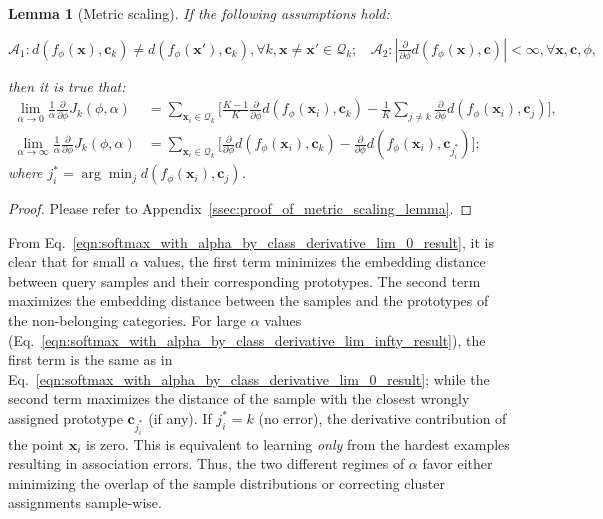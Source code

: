 \documentclass{article}
\renewcommand{\vec}[1]{\mathbf{#1}}
\newcommand{\query}[1]{\mathcal{Q}_{#1}}
\newcommand{\metric}{d}
\newtheorem{lemma}{Lemma}
\begin{document}
\begin{lemma}[Metric scaling] \label{lem:metric_scaling}
If the following assumptions hold: 

$\mathcal{A}_1: \metric(f_{\phi}(\vec{x}), \vec{c}_k) \neq \metric(f_{\phi}(\vec{x'}), \vec{c}_k), \forall k, \vec{x} \neq \vec{x'} \in \query{k}; \ \ \ \ \mathcal{A}_2: \left|\frac{\partial}{\partial\phi} \metric(f_{\phi}(\vec{x}), \vec{c}) \right| < \infty, \forall \vec{x}, \vec{c}, \phi,$

then it is true that:
\begin{align} 
    \lim_{\alpha \to 0} \frac{1}{\alpha}\frac{\partial}{\partial\phi}J_k(\phi,\alpha) &= \sum_{\vec{x}_i \in \query{k}} \Big[\frac{K-1}{K} \frac{\partial}{\partial\phi} \metric(f_{\phi}(\vec{x}_{i}), \vec{c}_k)  - \frac{1}{K} \sum_{j \neq k} \frac{\partial}{\partial\phi} \metric(f_{\phi}(\vec{x}_{i}), \vec{c}_j) \Big], \label{eqn:softmax_with_alpha_by_class_derivative_lim_0_result}  \\
    \lim_{\alpha \to \infty} \frac{1}{\alpha}\frac{\partial}{\partial\phi}J_k(\phi,\alpha) &= \sum_{\vec{x}_i \in \query{k}} \Big[ \frac{\partial}{\partial\phi} \metric(f_{\phi}(\vec{x}_{i}), \vec{c}_k)  - \frac{\partial}{\partial\phi} \metric(f_{\phi}(\vec{x}_{i}), \vec{c}_{j_{i}^*}) \Big]; \label{eqn:softmax_with_alpha_by_class_derivative_lim_infty_result} 
\end{align}
where $j_{i}^* = \arg\min_j \metric(f_{\phi}(\vec{x}_i), \vec{c}_j)$. 
\end{lemma}
\begin{proof}
Please refer to Appendix~\ref{ssec:proof_of_metric_scaling_lemma}.
\end{proof}
  
From Eq.~\eqref{eqn:softmax_with_alpha_by_class_derivative_lim_0_result}, it is clear that for small $\alpha$ values, the first term minimizes the embedding distance between query samples and their corresponding prototypes. The second term maximizes the embedding distance between the samples and the prototypes of the non-belonging categories. %
For large $\alpha$ values (Eq.~\eqref{eqn:softmax_with_alpha_by_class_derivative_lim_infty_result}), the first term is the same as in Eq.~\eqref{eqn:softmax_with_alpha_by_class_derivative_lim_0_result}; while the second term maximizes the distance of the sample with the closest wrongly assigned prototype $\mathbf{c}_{j^*_i}$ (if any). If $j^*_i = k$ (no error), the derivative contribution of the point $\vec{x}_{i}$ is zero. This is equivalent to learning \emph{only} from the hardest examples resulting in association errors. %
Thus, the two different regimes of $\alpha$ favor either minimizing the overlap of the sample distributions or correcting cluster assignments sample-wise. 
\end{document}
